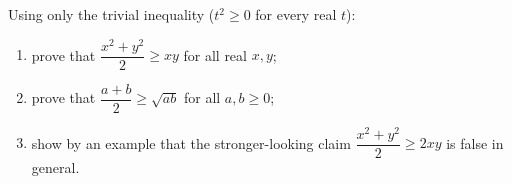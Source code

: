 Using only the trivial inequality ($t^2\ge0$ for every real $t$):
\begin{enumerate}
\item prove that $\dfrac{x^2+y^2}{2}\ge xy$ for all real $x,y$;
\item prove that $\dfrac{a+b}{2}\ge\sqrt{ab}$ for all $a,b\ge0$;
\item show by an example that the stronger-looking claim $\dfrac{x^2+y^2}{2}\ge2xy$ is false in general.
\end{enumerate}
